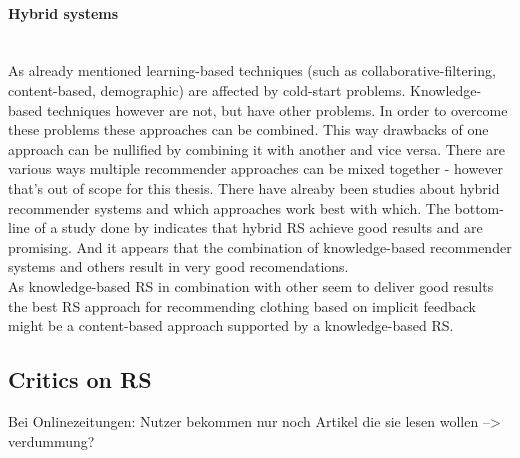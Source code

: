 \paragraph{Hybrid systems}\hfill\\
As already mentioned learning-based techniques (such as collaborative-filtering, content-based, demographic) are affected by cold-start problems.
Knowledge-based techniques however are not, but have other problems.
In order to overcome these problems these approaches can be combined.
This way drawbacks of one approach can be nullified by combining it with another and vice versa.
There are various ways multiple recommender approaches can be mixed together - however that's out of scope for this thesis.
\citep[p.~378-380]{burke:2007}
There have alreaby been studies about hybrid recommender systems and which approaches work best with which.
The bottom-line of a study done by \citeauthor{burke:2007} indicates that hybrid RS achieve good results and are promising.
And it appears that the combination of knowledge-based recommender systems and others result in very good recomendations.
\citep[p.~405-406]{burke:2007}
\\

\noindent
As knowledge-based RS in combination with other seem to deliver good results the best RS approach for recommending clothing based on implicit feedback might be a content-based approach supported by a knowledge-based RS.



\subsection{Critics on RS}
Bei Onlinezeitungen: Nutzer bekommen nur noch Artikel die sie lesen wollen --> verdummung?
